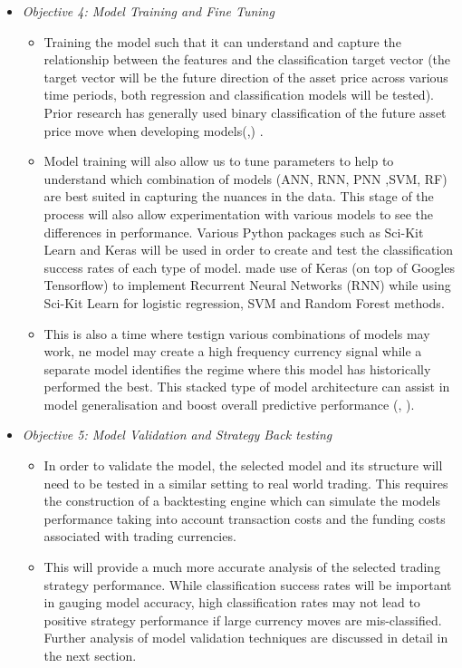 \documentclass[12pt, a4paper]{article}
\begin{document}
\begin{itemize}
\item \textit{Objective 4: Model Training and Fine Tuning}
\begin{itemize}
\item Training the model such that it can understand and capture the relationship between the features and the classification target vector (the target vector will be the future direction of the asset price across various time periods, both regression and classification models will be tested). Prior research has generally used binary classification of the future asset price move when developing models(\cite{Abreu2018},\cite{Gunduz2018}) \cite{Chatzis2018}.
\item Model training will also allow us to tune parameters to help to understand which combination of models (ANN, RNN, PNN ,SVM, RF) are best suited in capturing the nuances in the data. This stage of the process will also allow experimentation with various  models to see the differences in performance. Various Python packages such as Sci-Kit Learn and Keras will be used in order to create and test the classification success rates of each type of model. \cite{Fischer2012017} made use of Keras (on top of Googles Tensorflow) to implement Recurrent Neural Networks (RNN) while using Sci-Kit Learn for logistic regression, SVM and Random Forest methods.
\item This is also a time where testign various combinations of models may work, ne model may create a high frequency currency signal while a separate model identifies the regime where this model has historically performed the best. This stacked type of model architecture can assist in model generalisation and boost overall predictive performance (\cite{Chatzis2018}, \cite{Stock2010}).
\end{itemize} 
 \item \textit{Objective 5: Model Validation and Strategy Back testing}
	\begin{itemize}
	\item In order to validate the model, the selected model and its structure will need to be tested in a similar setting to real world trading. This requires the construction of a backtesting engine which can simulate the models performance taking into account transaction costs and the funding costs associated with trading currencies.
	\item  This will provide a much more accurate analysis of the selected trading strategy performance. While classification success rates will be important in gauging model accuracy, high classification rates may not lead to positive strategy performance if large currency moves are mis-classified. Further analysis of model validation techniques are discussed in detail in the next section.
	\end{itemize}
\end{itemize}
\end{document}
